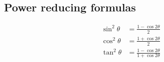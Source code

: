 \subsection*{Power reducing formulas}

\begin{align*}
  \sin^2 \theta  &= \frac{1 - \cos 2\theta}{2}\\
  \cos^2 \theta  &= \frac{1 + \cos 2\theta}{2}\\
  \tan^2 \theta  &= \frac{1 - \cos 2\theta}{1 + \cos 2\theta}
\end{align*}